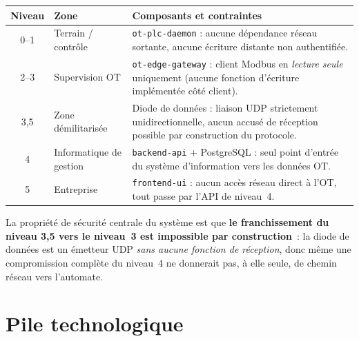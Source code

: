 \documentclass[11pt,a4paper]{report}
\begin{document}
\begin{center}
\begin{tabular}{@{}cl p{7.5cm}@{}}
\toprule
\textbf{Niveau} & \textbf{Zone} & \textbf{Composants et contraintes} \\
\midrule
0--1 & Terrain / contrôle & \texttt{ot-plc-daemon} : aucune dépendance réseau
sortante, aucune écriture distante non authentifiée. \\
2--3 & Supervision OT & \texttt{ot-edge-gateway} : client Modbus en
\emph{lecture seule} uniquement (aucune fonction d'écriture implémentée côté
client). \\
3,5 & Zone démilitarisée & Diode de données : liaison UDP strictement
unidirectionnelle, aucun accusé de réception possible par construction du
protocole. \\
4 & Informatique de gestion & \texttt{backend-api} + PostgreSQL : seul point
d'entrée du système d'information vers les données OT. \\
5 & Entreprise & \texttt{frontend-ui} : aucun accès réseau direct à l'OT, tout
passe par l'API de niveau~4. \\
\bottomrule
\end{tabular}
\end{center}

La propriété de sécurité centrale du système est que \textbf{le franchissement
du niveau 3,5 vers le niveau~3 est impossible par construction}~: la diode de
données est un émetteur UDP \emph{sans aucune fonction de réception}, donc même
une compromission complète du niveau~4 ne donnerait pas, à elle seule, de
chemin réseau vers l'automate.

\chapter{Pile technologique}
\label{chap:tech-stack}
\end{document}
